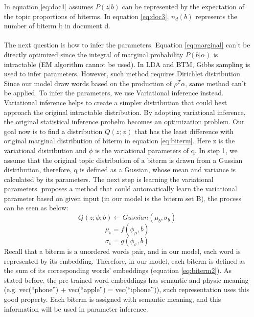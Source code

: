 In equation \ref{eq:doc1} assumes $P(z|b)$ can be represented by the expectation of the topic proportions of biterms. In equation \ref{eq:doc3}, $n_d(b)$ represents the number of biterm b in document d.
\\\\
The next question is how to infer the parameters. Equation \ref{eq:marginal} can't be directly optimized since the integral of marginal probability $P(b|\alpha)$ is intractable (EM algorithm cannot be used). In LDA and BTM, Gibbs sampling is used to infer parameters. However, such method requires Dirichlet distribution. Since our model draw words based on the production of $\rho^T\alpha$, same method can't be applied. To infer the parameters, we use Variational inference\cite{wainwright2008graphical} instead. Variational inference helps to create a simpler distribution that could best approach the original intractable distribution. By adopting variational inference, the original statistical inference probelm becomes an optimization problem. Our goal now is to find a distribution $Q(z; \phi)$ that has the least difference with original marginal distribution of biterm in equation \ref{eq:biterm}. Here z is the variational distribution and $\phi$ is the variational parameters of q.
In step 1, we assume that the original topic distribution of a biterm is drawn from a Gussian distribution, therefore, q is defined as a Gussian, whose mean and variance is calculated by its parameters. The next step is learning the variational parameters. \cite{kingma2013auto} proposes a method that could automatically learn the variational parameter based on given input (in our model is the biterm set B), the process can be seen as below:
\begin{equation}
    Q(z;\phi;b) \leftarrow Gussian(\mu_b,\sigma_b)
\label{eq:var1}
\end{equation}
\begin{equation}
    \mu_b = f(\phi_{\mu}, b)
\label{eq:var2}
\end{equation}
\begin{equation}
    \sigma_b = g(\phi_{\sigma}, b)
\label{eq:var3}
\end{equation}
Recall that a biterm is a unordered words pair, and in our model, each word is represented by its embedding. Therefore, in our model, each biterm is defined as the sum of its corresponding words' embeddings (equation \ref{eq:biterm2}). As stated before, the pre-trained word embeddings has semantic and physic meaning (e.g. vec(``phone'') + vec(``apple'') = vec(``iphone'')), such representation uses this good property. Each biterm is assigned with semantic meaning, and this information will be used in parameter inference.
